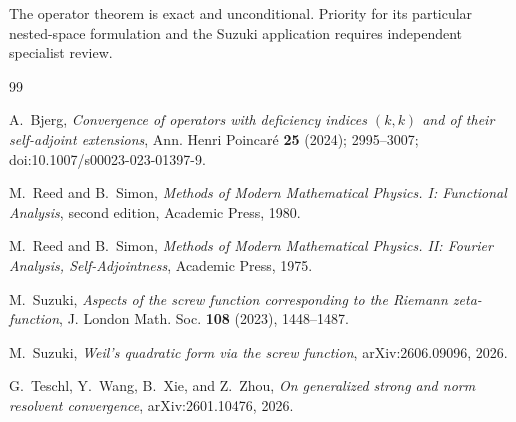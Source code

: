 \documentclass[11pt]{article}
\theoremstyle{remark}
\begin{document}
The operator theorem is exact and unconditional.  Priority for its particular nested-space
formulation and the Suzuki application requires independent specialist review.

\begin{thebibliography}{99}

A.~Bjerg,
\emph{Convergence of operators with deficiency indices $(k,k)$ and of their self-adjoint
extensions},
Ann. Henri Poincar\'e \textbf{25} (2024);
2995--3007; doi:10.1007/s00023-023-01397-9.

M.~Reed and B.~Simon,
\emph{Methods of Modern Mathematical Physics. I: Functional Analysis},
second edition, Academic Press, 1980.

M.~Reed and B.~Simon,
\emph{Methods of Modern Mathematical Physics. II: Fourier Analysis, Self-Adjointness},
Academic Press, 1975.

M.~Suzuki,
\emph{Aspects of the screw function corresponding to the Riemann zeta-function},
J. London Math. Soc. \textbf{108} (2023), 1448--1487.

M.~Suzuki,
\emph{Weil's quadratic form via the screw function},
arXiv:2606.09096, 2026.

G.~Teschl, Y.~Wang, B.~Xie, and Z.~Zhou,
\emph{On generalized strong and norm resolvent convergence},
arXiv:2601.10476, 2026.

\end{thebibliography}
\end{document}
